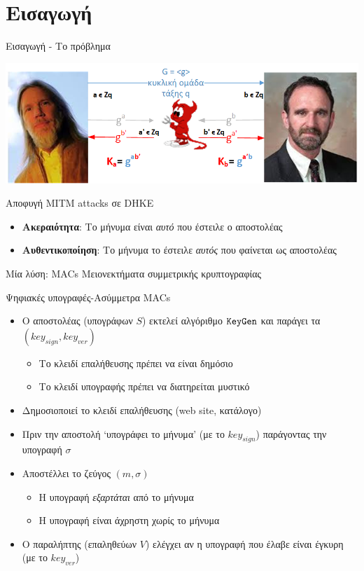 \documentclass{beamer}
\begin{document}
\section{Εισαγωγή}
\begin{frame}{Εισαγωγή - Το πρόβλημα}
\begin{center}
\includegraphics[scale=0.5]{dh-mitm.png}
\end{center}
\pause
Αποφυγή MITM attacks σε DHKE
\begin{itemize}
\item \textbf{Ακεραιότητα}: Το μήνυμα είναι \emph{αυτό} που έστειλε ο αποστολέας
\item \textbf{Αυθεντικοποίηση}: Το μήνυμα το έστειλε \emph{αυτός} που φαίνεται ως αποστολέας
\end{itemize}
\pause
Μία λύση: MACs
\alert{Μειονεκτήματα συμμετρικής κρυπτογραφίας}
\end{frame}

\begin{frame}{Ψηφιακές υπογραφές-Ασύμμετρα MACs}
\begin{itemize}
\item Ο αποστολέας (υπογράφων $S$) εκτελεί αλγόριθμο $\mathtt{KeyGen}$ και παράγει τα $(key_{sign},key_{ver})$
\begin{itemize}
\item Το κλειδί επαλήθευσης πρέπει να είναι δημόσιο\\
\item Το κλειδί υπογραφής πρέπει να διατηρείται μυστικό\\
\end{itemize}
\item Δημοσιοποιεί το κλειδί επαλήθευσης (web site, κατάλογο)
\pause
\item Πριν την αποστολή `υπογράφει το μήνυμα' (με το $key_{sign}$) παράγοντας την υπογραφή $\sigma$
\pause
\item Αποστέλλει το ζεύγος $(m,\sigma)$
\begin{itemize}
\item Η υπογραφή \emph{εξαρτάται} από το μήνυμα
\item Η υπογραφή είναι άχρηστη χωρίς το μήνυμα
\end{itemize}
\pause
\item Ο παραλήπτης (επαληθεύων $V$) ελέγχει αν η υπογραφή που έλαβε είναι έγκυρη (με το $key_{ver}$)
\end{itemize}
\end{frame}
\end{document}
